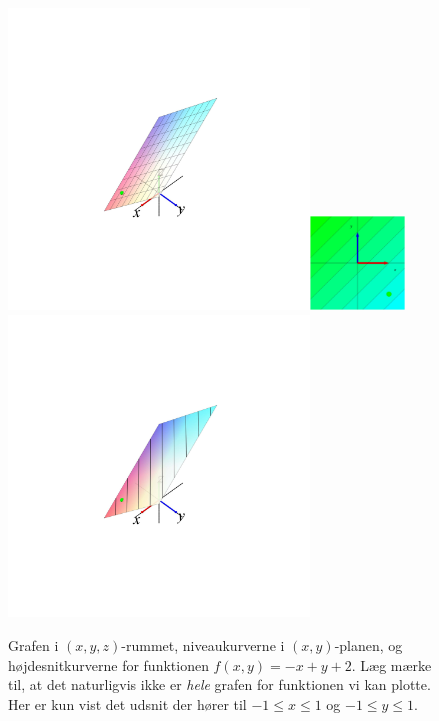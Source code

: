 \begin{figure}[h]
\centerline{\includegraphics[height=80mm]{plotLin.pdf}\quad \includegraphics[height=25mm]{plotLinNiveau.pdf} \quad \includegraphics[height=80mm]{plotLinNiveauUP.pdf}}
\begin{center}
\caption{Grafen i $(x,y,z)$-rummet, niveaukurverne i $(x,y)$-planen, og højdesnitkurverne for funktionen $f(x,y) = -x + y + 2$. Læg mærke til, at det naturligvis ikke er \emph{hele} grafen for funktionen vi kan plotte. Her er kun vist det udsnit der hører til $-1 \leq x \leq 1$ og $-1 \leq y \leq 1$.} \label{figLin}
\end{center}
\end{figure}


